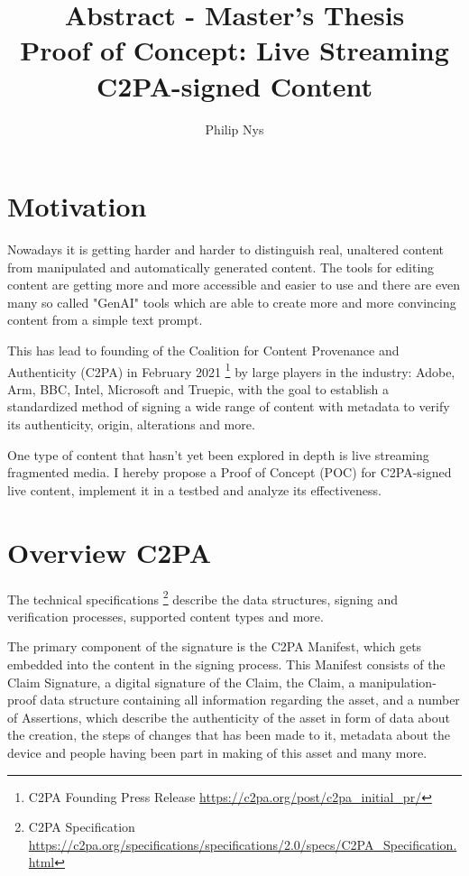 \documentclass[a4paper]{article}
\author{Philip Nys}
\title{Abstract - Master's Thesis\\Proof of Concept: Live Streaming C2PA-signed Content}
\begin{document}
\maketitle


\section{Motivation}

Nowadays it is getting harder and harder to distinguish real, unaltered content from manipulated and automatically generated content. The tools for editing content are getting more and more accessible and easier to use and there are even many so called "GenAI" tools which are able to create more and more convincing content from a simple text prompt.

This has lead to founding of the Coalition for Content Provenance and Authenticity (C2PA) in February 2021 \footnote{C2PA Founding Press Release \url{https://c2pa.org/post/c2pa_initial_pr/}} by large players in the industry: Adobe, Arm, BBC, Intel, Microsoft and Truepic, with the goal to establish a standardized method of signing a wide range of content with metadata to verify its authenticity, origin, alterations and more.

One type of content that hasn't yet been explored in depth is live streaming fragmented media. I hereby propose a Proof of Concept (POC) for C2PA-signed live content, implement it in a testbed and analyze its effectiveness.

\section{Overview C2PA}

The technical specifications \footnote{C2PA Specification \url{https://c2pa.org/specifications/specifications/2.0/specs/C2PA_Specification.html}} describe the data structures, signing and verification processes, supported content types and more.

The primary component of the signature is the C2PA Manifest, which gets embedded into the content in the signing process. This Manifest consists of the Claim Signature, a digital signature of the Claim, the Claim, a manipulation-proof data structure containing all information regarding the asset, and a number of Assertions, which describe the authenticity of the asset in form of data about the creation, the steps of changes that has been made to it, metadata about the device and people having been part in making of this asset and many more.
\end{document}
